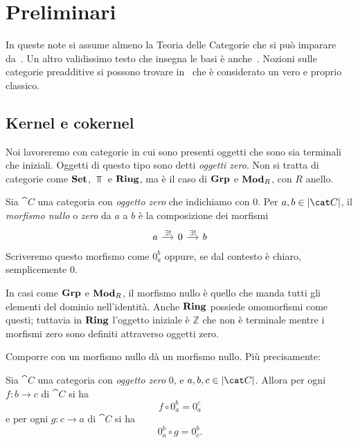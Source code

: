 
\chapter{Preliminari}

In queste note si assume almeno la {\sc Teoria delle Categorie} che si
può imparare da~\cite{leinster:categories}. Un altro validissimo testo
che insegna le basi è anche~\cite{riehl:categories}. Nozioni sulle
categorie preadditive si possono trovare in~\cite{maclane:categories}
che è considerato un vero e proprio classico.


\section{Kernel e cokernel}

Noi lavoreremo con categorie in cui sono presenti oggetti che sono sia
terminali che iniziali. Oggetti di questo tipo sono detti {\em oggetti
  zero}. Non si tratta di categorie come \(\mathbf{Set}\), \(\Top\) e
\(\mathbf{Ring}\), ma è il caso di \(\mathbf{Grp}\) e \(\mathbf{Mod}_R\), con \(R\) anello.

\begin{definition}
  Sia \(\cat C\) una categoria con {\em oggetto zero} che indichiamo
  con \(0\). Per \(a, b \in \obj{\cat C}\), il {\em morfismo nullo} o
  {\em zero} da \(a\) a \(b\) è la composizione dei morfismi
  \[
    \begin{tikzcd}[column sep=small]
      a \ar["{\exists!}", r] & 0 \ar["{\exists!}", r] & b
    \end{tikzcd}
  \]
  Scriveremo questo morfismo come \(0_a^b\) oppure, se dal contesto è
  chiaro, semplicemente \(0\).
\end{definition}

\begin{example}
  In casi come \(\mathbf{Grp}\) e \(\mathbf{Mod}_R\), il morfismo nullo è quello che
  manda tutti gli elementi del dominio nell'identità. Anche \(\mathbf{Ring}\)
  possiede omomorfismi come questi; tuttavia in \(\mathbf{Ring}\) l'oggetto
  iniziale è \(\mathbb{Z}\) che non è terminale mentre i morfismi zero sono
  definiti attraverso oggetti zero.
\end{example}

Comporre con un morfismo nullo dà un morfismo nullo. Più precisamente:

\begin{proposition}\label{lemma:CompCon0}
  Sia \(\cat C\) una categoria con {\em oggetto zero} \(0\), e
  \(a, b, c \in \obj{\cat C}\). Allora per ogni \(f : b \to c\) di
  \(\cat C\) si ha
  \[
    f \circ 0_a^b = 0_a^c
  \]
  e per ogni \(g : c \to a\) di \(\cat C\) si ha
  \[
    0_a^b \circ g = 0_c^b .
  \]
\end{proposition}


